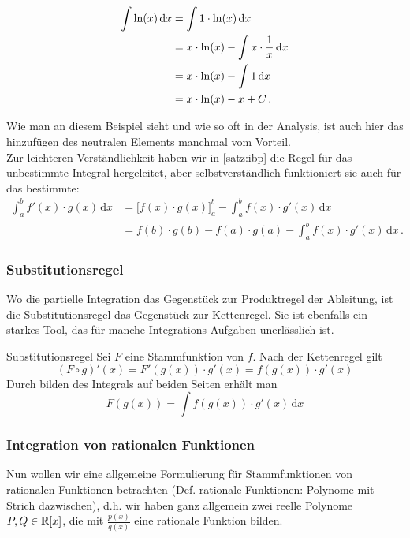 \begin{example}
\begin{align*}
\int \ln(x) \,\mathrm{d}x &= \int 1 \cdot \ln(x) \,\mathrm{d}x\\ 
& = x \cdot \ln(x) - \int x \cdot {1 \over x} \,\mathrm{d}x \\
& = x \cdot \ln(x) - \int 1 \,\mathrm{d}x \\
& = x \cdot \ln(x) - x + C\,.
\end{align*}
\end{example}
Wie man an diesem Beispiel sieht und wie so oft in der Analysis, ist auch hier das hinzufügen des neutralen Elements manchmal vom Vorteil.
\vspace{3mm}\\
Zur leichteren Verständlichkeit haben wir in \ref{satz:ibp} die Regel für das unbestimmte Integral hergeleitet, aber selbstverständlich funktioniert sie auch für das bestimmte:
\begin{align*} 
\int_a^b f'(x)\cdot g(x)\,\mathrm{d}x 
&= \Big[f(x)\cdot g(x)\Big]_{a}^{b} - \int_a^b f(x)\cdot g'(x)\,\mathrm{d}x\\
&=f(b) \cdot g(b) - f(a) \cdot g(a) - \int_a^b f(x)\cdot g'(x)\,\mathrm{d}x\,.
\end{align*}
\begin{example}[ ]
    
\end{example}

\subsubsection{Substitutionsregel}
Wo die partielle Integration das Gegenstück zur Produktregel der Ableitung, ist die Substitutionsregel das Gegenstück zur Kettenregel. Sie ist ebenfalls ein starkes Tool, das für manche Integrations-Aufgaben unerlässlich ist. 
\begin{satz}{Substitutionsregel}{}
Sei $F$ eine Stammfunktion von $f$. Nach der Kettenregel gilt
$$(F \circ g)'(x) = F'(g(x))\cdot g'(x) = f(g(x))\cdot g'(x)$$
Durch bilden des Integrals auf beiden Seiten erhält man
$$F(g(x)) = \int f(g(x))\cdot g'(x)\, \mathrm{d}x $$
\end{satz}


\subsubsection{Integration von rationalen Funktionen}
Nun wollen wir eine allgemeine Formulierung für Stammfunktionen von rationalen Funktionen betrachten (Def. rationale Funktionen: Polynome mit Strich dazwischen), d.h. wir haben ganz allgemein zwei reelle Polynome $P,Q \in \mathbb{R}[x]$, die mit $\frac{p(x)}{q(x)}$ eine rationale Funktion bilden.

